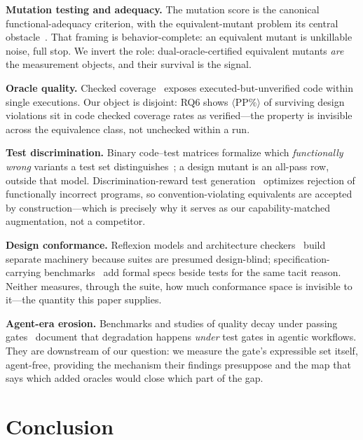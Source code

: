\documentclass[conference]{IEEEtran}
\newcommand{\ph}[1]{\colorbox{yellow!35}{\small$\langle$\textsf{#1}$\rangle$}}
\begin{document}
\textbf{Mutation testing and adequacy.} The mutation score is the canonical functional-adequacy criterion, with the equivalent-mutant problem its central obstacle~\cite{jia2011analysis}. That framing is behavior-complete: an equivalent mutant is unkillable noise, full stop. We invert the role: dual-oracle-certified equivalent mutants \emph{are} the measurement objects, and their survival is the signal.

\textbf{Oracle quality.} Checked coverage~\cite{schuler2011checked} exposes executed-but-unverified code within single executions. Our object is disjoint: RQ6 shows \ph{PP\%} of surviving design violations sit in code checked coverage rates as verified---the property is invisible across the equivalence class, not unchecked within a run.

\textbf{Test discrimination.} Binary code--test matrices formalize which \emph{functionally wrong} variants a test set distinguishes~\cite{binarymatrix}; a design mutant is an all-pass row, outside that model. Discrimination-reward test generation~\cite{utrl} optimizes rejection of functionally incorrect programs, so convention-violating equivalents are accepted by construction---which is precisely why it serves as our capability-matched augmentation, not a competitor.

\textbf{Design conformance.} Reflexion models and architecture checkers~\cite{murphy2001reflexion} build separate machinery because suites are presumed design-blind; specification-carrying benchmarks~\cite{verina} add formal specs beside tests for the same tacit reason. Neither measures, through the suite, how much conformance space is invisible to it---the quantity this paper supplies.

\textbf{Agent-era erosion.} Benchmarks and studies of quality decay under passing gates~\cite{slopcodebench,constraintdecay} document that degradation happens \emph{under} test gates in agentic workflows. They are downstream of our question: we measure the gate's expressible set itself, agent-free, providing the mechanism their findings presuppose and the map that says which added oracles would close which part of the gap.

\section{Conclusion}\label{sec:conclusion}
\end{document}
